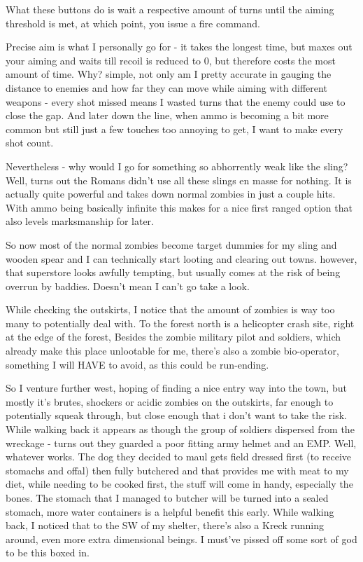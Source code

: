 What these buttons do is wait a respective amount of turns until the aiming threshold is met, at which point, you issue a fire command.

Precise aim is what I personally go for - it takes the longest time, but maxes out your aiming and waits till recoil is reduced to 0, but therefore costs the most amount of time. Why? simple, not only am I pretty accurate in gauging the distance to enemies and how far they can move while aiming with different weapons - every shot missed means I wasted turns that the enemy could use to close the gap. And later down the line, when ammo is becoming a bit more common but still just a few touches too annoying to get, I want to make every shot count.

Nevertheless - why would I go for something so abhorrently weak like the sling? Well, turns out the Romans didn't use all these slings en masse for nothing. It is actually quite powerful and takes down normal zombies in just a couple hits. With ammo being basically infinite this makes for a nice first ranged option that also levels marksmanship for later.

So now most of the normal zombies become target dummies for my sling and wooden spear and I can technically start looting and clearing out towns. however, that superstore looks awfully tempting, but usually comes at the risk of being overrun by baddies. Doesn't mean I can't go take a look.

While checking the outskirts, I notice that the amount of zombies is way too many to potentially deal with. To the forest north is a helicopter crash site, right at the edge of the forest, Besides the zombie military pilot and soldiers, which already make this place unlootable for me, there's also a zombie bio-operator, something I will HAVE to avoid, as this could be run-ending.

So I venture further west, hoping of finding a nice entry way into the town, but mostly it's brutes, shockers or acidic zombies on the outskirts, far enough to potentially squeak through, but close enough that i don't want to take the risk. While walking back it appears as though the group of soldiers dispersed from the wreckage - turns out they guarded a poor fitting army helmet and an EMP. Well, whatever works. The dog they decided to maul gets field dressed first (to receive stomachs and offal) then fully butchered and that provides me with meat to my diet, while needing to be cooked first, the stuff will come in handy, especially the bones. The stomach that I managed to butcher will be turned into a sealed stomach, more water containers is a helpful benefit this early. While walking back, I noticed that to the SW of my shelter, there's also a Kreck running around, even more extra dimensional beings. I must've pissed off some sort of god to be this boxed in.

